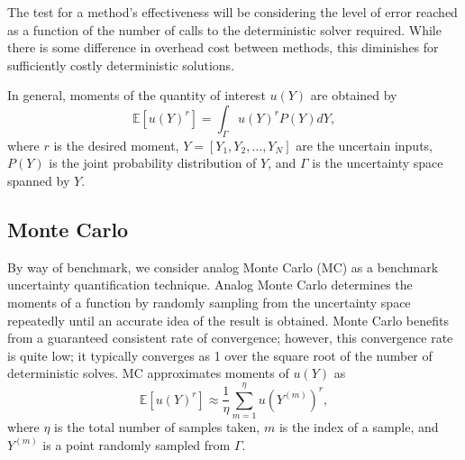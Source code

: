 \documentclass{mc2015}
\newcommand{\expv}[1]{\ensuremath{\mathbb{E}[ #1]}}
\begin{document}
The test for a method's effectiveness will be considering the level of error reached as a function of the number of calls to the deterministic solver required.  While there is some difference in overhead cost between methods, this diminishes for sufficiently costly deterministic solutions.

In general, moments of the quantity of interest $u(Y)$ are obtained by
\begin{equation}
\expv{u(Y)^r} = \int_\Gamma u(Y)^r P(Y) dY,
\end{equation}
where $r$ is the desired moment, $Y=[Y_1,Y_2,\ldots,Y_N]$ are the uncertain inputs, $P(Y)$ is the joint probability distribution of $Y$, and $\Gamma$ is the uncertainty space spanned by $Y$.

\subsection{Monte Carlo}
By way of benchmark, we consider analog Monte Carlo (MC) as a benchmark uncertainty quantification technique.
Analog Monte Carlo determines the moments of a function by randomly sampling from the uncertainty space repeatedly until an accurate idea of the result is obtained.  Monte Carlo benefits from a guaranteed consistent rate of convergence; however, this convergence rate is quite low; it typically converges as 1 over the square root of the number of deterministic solves.
MC approximates moments of $u(Y)$ as
\begin{equation}
\expv{u(Y)^r}\approx \frac{1}{\eta}\sum_{m=1}^\eta u(Y^{(m)})^r,
\end{equation}
where $\eta$ is the total number of samples taken, $m$ is the index of a sample, and $Y^{(m)}$ is a point randomly sampled from $\Gamma$.
\end{document}

